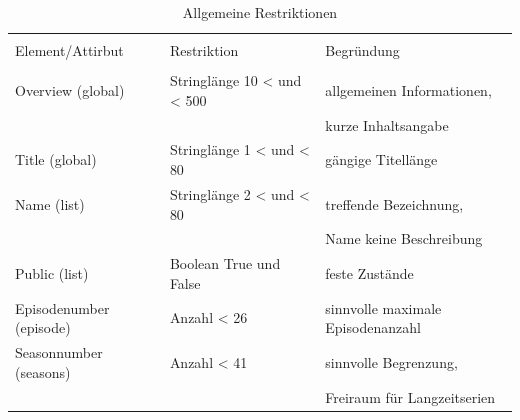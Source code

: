 \documentclass[a4paper]{article}
\begin{document}
\begin{table}[H]
\caption{Allgemeine Restriktionen}


\begin{tabular}{l l l}
\\ [-0.5ex]

\hline\hline
\\ [-0.5ex]
Element/Attirbut & Restriktion & Begründung
\\ [1.5ex]
\hline
\\ [-0.5ex]
Overview (global) & Stringlänge 10 < und < 500 & allgemeinen Informationen,\\[1ex]
&&kurze Inhaltsangabe\\[3ex]
Title (global) & Stringlänge 1 < und < 80 & gängige Titellänge\\[3ex]
Name (list) & Stringlänge 2 < und < 80 & treffende Bezeichnung,\\[1ex] 
&&Name keine Beschreibung \\[3ex] 
Public (list) & Boolean True und False & feste Zustände \\[3ex] 
Episodenumber (episode) & Anzahl < 26 & sinnvolle maximale Episodenanzahl\\[3ex] 
Seasonnumber (seasons) & Anzahl < 41 & sinnvolle Begrenzung, \\[1ex]
&&Freiraum für Langzeitserien \\[2ex] 

\hline
\end{tabular}
\label{tab:restriktionenderxsd}
\end{table}
\end{document}
